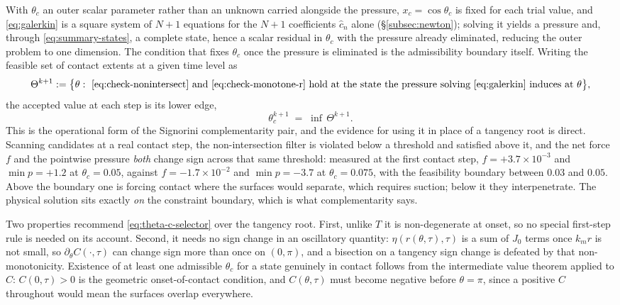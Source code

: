 With $\theta_c$ an outer scalar parameter rather than an unknown carried alongside the pressure, $x_c=\cos\theta_c$ is fixed for each trial value, and \eqref{eq:galerkin} is a square system of $N+1$ equations for the $N+1$ coefficients $\hat c_n$ alone (\S\ref{subsec:newton}); solving it yields a pressure and, through \eqref{eq:summary-states}, a complete state, hence a scalar residual in $\theta_c$ with the pressure already eliminated, reducing the outer problem to one dimension. The condition that fixes $\theta_c$ once the pressure is eliminated is the admissibility boundary itself. Writing the feasible set of contact extents at a given time level as
\begin{equation}
    \Theta^{k+1} := \big\{\theta:\ \eqref{eq:check-nonintersect}\ \text{and}\ \eqref{eq:check-monotone-r}\ \text{hold at the state the pressure solving \eqref{eq:galerkin} induces at }\theta\big\}\text{,}
    \label{eq:feasible-set}
\end{equation}
the accepted value at each step is its lower edge,
\begin{equation}
    \theta_c^{k+1} \;=\; \inf\,\Theta^{k+1}\text{.}
    \label{eq:theta-c-selector}
\end{equation}
This is the operational form of the Signorini complementarity pair, and the evidence for using it in place of a tangency root is direct. Scanning candidates at a real contact step, the non-intersection filter is violated below a threshold and satisfied above it, and the net force $f$ and the pointwise pressure \emph{both} change sign across that same threshold: measured at the first contact step, $f=+3.7\times10^{-3}$ and $\min p=+1.2$ at $\theta_c=0.05$, against $f=-1.7\times10^{-2}$ and $\min p=-3.7$ at $\theta_c=0.075$, with the feasibility boundary between $0.03$ and $0.05$. Above the boundary one is forcing contact where the surfaces would separate, which requires suction; below it they interpenetrate. The physical solution sits exactly \emph{on} the constraint boundary, which is what complementarity says.

Two properties recommend \eqref{eq:theta-c-selector} over the tangency root. First, unlike $T$ it is non-degenerate at onset, so no special first-step rule is needed on its account. Second, it needs no sign change in an oscillatory quantity: $\eta(r(\theta,\tau),\tau)$ is a sum of $J_0$ terms once $k_mr$ is not small, so $\partial_\theta C(\cdot,\tau)$ can change sign more than once on $(0,\pi)$, and a bisection on a tangency sign change is defeated by that non-monotonicity. Existence of at least one admissible $\theta_c$ for a state genuinely in contact follows from the intermediate value theorem applied to $C$: $C(0,\tau)>0$ is the geometric onset-of-contact condition, and $C(\theta,\tau)$ must become negative before $\theta=\pi$, since a positive $C$ throughout would mean the surfaces overlap everywhere.

